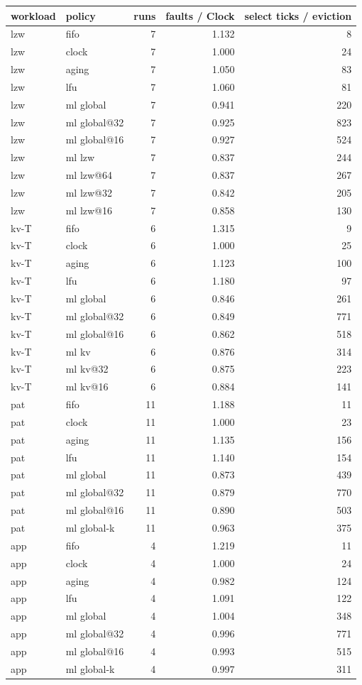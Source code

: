 \begin{tabular}{llrrr}
\toprule
workload & policy & runs & faults / Clock & select ticks / eviction \\
\midrule
lzw & fifo & 7 & 1.132 & 8 \\
lzw & clock & 7 & 1.000 & 24 \\
lzw & aging & 7 & 1.050 & 83 \\
lzw & lfu & 7 & 1.060 & 81 \\
lzw & ml global & 7 & 0.941 & 220 \\
lzw & ml global@32 & 7 & 0.925 & 823 \\
lzw & ml global@16 & 7 & 0.927 & 524 \\
lzw & ml lzw & 7 & 0.837 & 244 \\
lzw & ml lzw@64 & 7 & 0.837 & 267 \\
lzw & ml lzw@32 & 7 & 0.842 & 205 \\
lzw & ml lzw@16 & 7 & 0.858 & 130 \\
kv-T & fifo & 6 & 1.315 & 9 \\
kv-T & clock & 6 & 1.000 & 25 \\
kv-T & aging & 6 & 1.123 & 100 \\
kv-T & lfu & 6 & 1.180 & 97 \\
kv-T & ml global & 6 & 0.846 & 261 \\
kv-T & ml global@32 & 6 & 0.849 & 771 \\
kv-T & ml global@16 & 6 & 0.862 & 518 \\
kv-T & ml kv & 6 & 0.876 & 314 \\
kv-T & ml kv@32 & 6 & 0.875 & 223 \\
kv-T & ml kv@16 & 6 & 0.884 & 141 \\
pat & fifo & 11 & 1.188 & 11 \\
pat & clock & 11 & 1.000 & 23 \\
pat & aging & 11 & 1.135 & 156 \\
pat & lfu & 11 & 1.140 & 154 \\
pat & ml global & 11 & 0.873 & 439 \\
pat & ml global@32 & 11 & 0.879 & 770 \\
pat & ml global@16 & 11 & 0.890 & 503 \\
pat & ml global-k & 11 & 0.963 & 375 \\
app & fifo & 4 & 1.219 & 11 \\
app & clock & 4 & 1.000 & 24 \\
app & aging & 4 & 0.982 & 124 \\
app & lfu & 4 & 1.091 & 122 \\
app & ml global & 4 & 1.004 & 348 \\
app & ml global@32 & 4 & 0.996 & 771 \\
app & ml global@16 & 4 & 0.993 & 515 \\
app & ml global-k & 4 & 0.997 & 311 \\
\bottomrule
\end{tabular}
